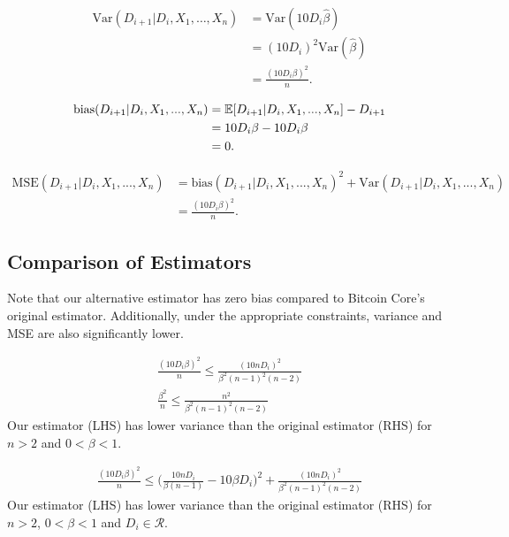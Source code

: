 \begin{align}
\text{Var}(D_{i+1} | D_{i}, X_1, \dots, X_{n}) &= \text{Var}(10 D_i \hat{\beta}) \\
&= (10 D_i)^2 \text{Var}(\hat{\beta}) \\
&= \frac{(10 D_i\beta)^2}{n}.
\end{align}

\begin{align}
\text{bias}(D_{i+1}|D_i,X_1,...,X_n) &= \operatorname{\mathbb{E}}[D_{i+1}|D_i,X_1,...,X_n] - D_{i+1} \\
&= 10 D_i\beta - 10 D_i\beta \\
&= 0.
\end{align}

\begin{align}
\text{MSE}(D_{i+1}|D_i,X_1,...,X_n) &= \text{bias}(D_{i+1}|D_i,X_1,...,X_n)^2 + \text{Var}(D_{i+1}|D_i,X_1,...,X_n) \\
&= \frac{(10 D_i\beta)^2}{n}.
\end{align}

\subsection{Comparison of Estimators}
Note that our alternative estimator has zero bias compared to Bitcoin Core's original estimator. Additionally, under the appropriate constraints, variance and MSE are also significantly lower.
\par \noindent {}
\begin{align}
\frac{(10 D_i\beta)^2}{n} \leq \frac{(10n D_i)^2}{\beta^2(n-1)^2(n-2)} \\
\frac{\beta^2}{n} \leq \frac{n^2}{\beta^2(n-1)^2(n-2)} 
\end{align}
Our estimator (LHS) has lower variance than the original estimator (RHS) for $n>2$ and $0<\beta<1$.

\begin{align}
\frac{(10 D_i\beta)^2}{n} \leq \Bigg(\frac{10n D_i}{\beta(n-1)} - 10\beta D_i\Bigg)^2 + \frac{(10n D_i)^2}{\beta^2(n-1)^2(n-2)}
\end{align}
Our estimator (LHS) has lower variance than the original estimator (RHS) for $n>2$, $0<\beta<1$ and $D_i \in \mathcal{R}$. 

